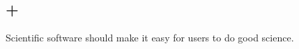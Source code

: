 \documentclass[aspectratio=169, 22pt]{beamer}
\newcommand{\hl}{\textcolor{usydred}}
\newcommand{\ex}{\textcolor{usydblue}}
\newenvironment{sectionslide}
			{\subsection*{+}\begin{frame}[fragile,environment=sectionslide]\vfill\begin{center}\Large}
			{\end{center}\vfill\end{frame}}
\begin{document}
\begin{sectionslide}
Scientific software should make it easy for users to do good science.
\end{sectionslide}

%
\end{document}
